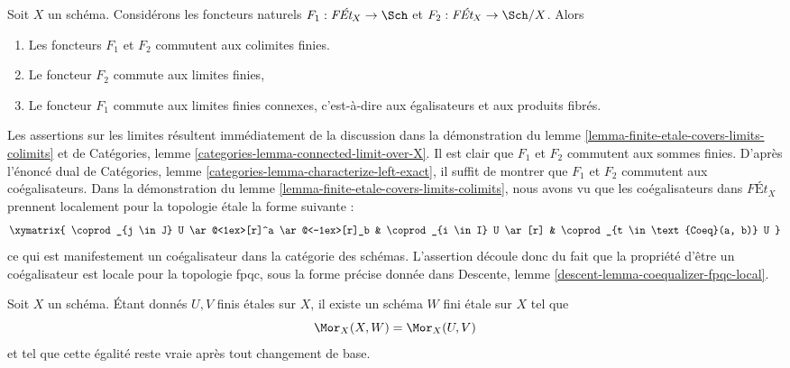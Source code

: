 \begin{remark}
\label{remark-colimits-commute-forgetful}
Soit $X$ un schéma. Considérons les foncteurs naturels
$F_1 : \textit{F\'Et}_X \to \Sch$ et $F_2 : \textit{F\'Et}_X \to \Sch/X$.
Alors
\begin{enumerate}
\item Les foncteurs $F_1$ et $F_2$ commutent aux colimites finies.
\item Le foncteur $F_2$ commute aux limites finies,
\item Le foncteur $F_1$ commute aux limites finies connexes, c'est-à-dire
aux égalisateurs et aux produits fibrés.
\end{enumerate}
Les assertions sur les limites résultent immédiatement de la discussion dans
la démonstration du lemme \ref{lemma-finite-etale-covers-limits-colimits}
et de Catégories, lemme \ref{categories-lemma-connected-limit-over-X}.
Il est clair que $F_1$ et $F_2$ commutent aux sommes finies.
D'après l'énoncé dual de Catégories, lemme
\ref{categories-lemma-characterize-left-exact},
il suffit de montrer que $F_1$ et $F_2$ commutent aux coégalisateurs.
Dans la démonstration du lemme \ref{lemma-finite-etale-covers-limits-colimits},
nous avons vu que les coégalisateurs dans $\textit{F\'Et}_X$ prennent localement pour la topologie \'etale
la forme suivante :
$$
\xymatrix{
\coprod_{j \in J} U \ar@<1ex>[r]^a \ar@<-1ex>[r]_b &
\coprod_{i \in I} U \ar[r] &
\coprod_{t \in \text{Coeq}(a, b)} U
}
$$
ce qui est manifestement un coégalisateur dans la catégorie des schémas.
L'assertion découle donc du fait que la propriété d'être un coégalisateur
est locale pour la topologie fpqc, sous la forme précise donnée dans
Descente, lemme \ref{descent-lemma-coequalizer-fpqc-local}.
\end{remark}

\begin{lemma}
\label{lemma-internal-hom-finite-etale}
Soit $X$ un schéma. Étant donnés $U, V$ finis \'etales sur $X$, il
existe un schéma $W$ fini \'etale sur $X$ tel que
$$
\Mor_X(X, W) = \Mor_X(U, V)
$$
et tel que cette égalité reste vraie après tout changement de base.
\end{lemma}


